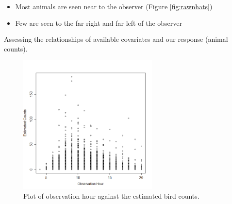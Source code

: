 \begin{itemize}
\item Most animals are seen near to the observer (Figure \ref{fig:rawnhats})
\item Few are seen to the far right and far left of the observer
\end{itemize}


\begin{frame}
Assessing the relationships of available covariates and our response (animal counts).
\end{frame}
\begin{frame}
\begin{figure}[h!]
  \centering
  \includegraphics[width=7cm]{bc/obshour.png}
\caption{Plot of observation hour against the estimated bird counts.}
\label{fig:nsexploratory1}
\end{figure}
\end{frame}

